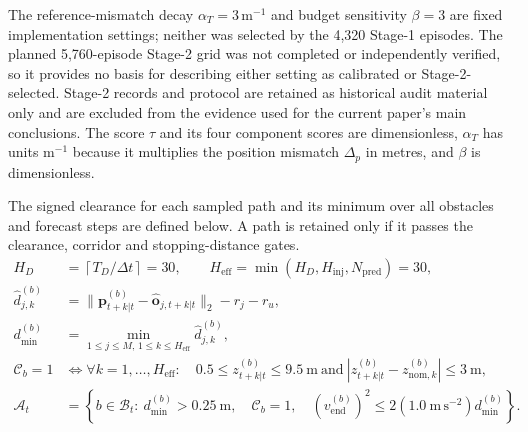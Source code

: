 \documentclass[10pt]{article}
\begin{document}
\noindent The reference-mismatch decay $\alpha_T=3\,\mathrm{m}^{-1}$ and budget sensitivity $\beta=3$ are fixed implementation settings; neither was selected by the 4,320 Stage-1 episodes. The planned 5,760-episode Stage-2 grid was not completed or independently verified, so it provides no basis for describing either setting as calibrated or Stage-2-selected. Stage-2 records and protocol are retained as historical audit material only and are excluded from the evidence used for the current paper's main conclusions. The score $\tau$ and its four component scores are dimensionless, $\alpha_T$ has units m$^{-1}$ because it multiplies the position mismatch $\Delta_p$ in metres, and $\beta$ is dimensionless.

The signed clearance for each sampled path and its minimum over all obstacles and forecast steps are defined below. A path is retained only if it passes the clearance, corridor and stopping-distance gates.
\begin{equation}
\begin{aligned}
H_D&=\left\lceil T_D/\Delta t\right\rceil=30,\qquad
H_{\mathrm{eff}}=\min(H_D,H_{\mathrm{inj}},N_{\mathrm{pred}})=30,\\
\hat d^{(b)}_{j,k}&=\|\mathbf p^{(b)}_{t+k|t}-\hat{\mathbf o}_{j,t+k|t}\|_2-r_j-r_u,\\
d_{\min}^{(b)}&=\min_{1\leq j\leq M,\,1\leq k\leq H_{\scriptstyle\mathrm{eff}}}\hat d^{(b)}_{j,k},\\
\mathcal C_b=1&\iff \forall k=1,\ldots,H_{\mathrm{eff}}:\quad
0.5\leq z^{(b)}_{t+k|t}\leq9.5~\mathrm m\ \text{and}\
|z^{(b)}_{t+k|t}-z_{\mathrm{nom},k}^{(b)}|\leq3~\mathrm m,\\
\mathcal A_t&=\left\{b\in\mathcal B_t:\ d_{\min}^{(b)}>0.25~\mathrm m,\quad
\mathcal C_b=1,\quad (v_{\mathrm{end}}^{(b)})^2\leq
2(1.0~\mathrm{m\,s^{-2}})d_{\min}^{(b)}\right\}.
\end{aligned}
\end{equation}
\end{document}

